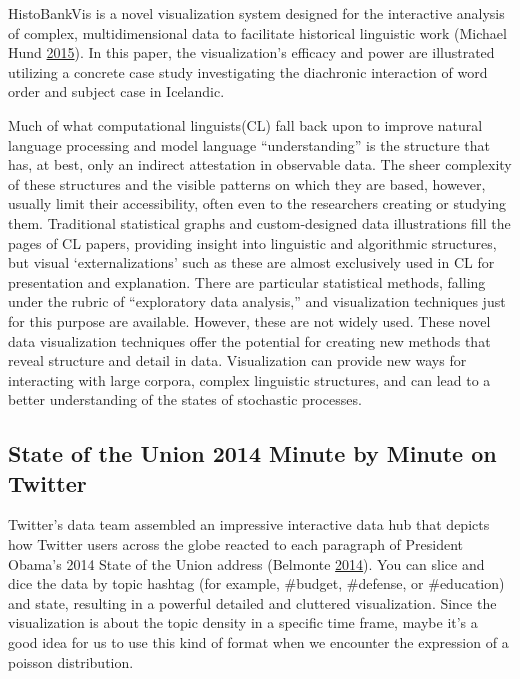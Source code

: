 \documentclass[]{book}
\begin{document}
HistoBankVis is a novel visualization system designed for the interactive analysis of complex, multidimensional data to facilitate historical linguistic work (Michael Hund \protect\hyperlink{ref-lingui_data1}{2015}). In this paper, the visualization's efficacy and power are illustrated utilizing a concrete case study investigating the diachronic interaction of word order and subject case in Icelandic.

Much of what computational linguists(CL) fall back upon to improve natural language processing and model language ``understanding'' is the structure that has, at best, only an indirect attestation in observable data. The sheer complexity of these structures and the visible patterns on which they are based, however, usually limit their accessibility, often even to the researchers creating or studying them. Traditional statistical graphs and custom-designed data illustrations fill the pages of CL papers, providing insight into linguistic and algorithmic structures, but visual `externalizations' such as these are almost exclusively used in CL for presentation and explanation. There are particular statistical methods, falling under the rubric of ``exploratory data analysis,'' and visualization techniques just for this purpose are available. However, these are not widely used. These novel data visualization techniques offer the potential for creating new methods that reveal structure and detail in data. Visualization can provide new ways for interacting with large corpora, complex linguistic structures, and can lead to a better understanding of the states of stochastic processes.

\hypertarget{state-of-the-union-2014-minute-by-minute-on-twitter}{%
\subsection{State of the Union 2014 Minute by Minute on Twitter}\label{state-of-the-union-2014-minute-by-minute-on-twitter}}

Twitter's data team assembled an impressive interactive data hub that depicts how Twitter users across the globe reacted to each paragraph of President Obama's 2014 State of the Union address (Belmonte \protect\hyperlink{ref-SotU2014}{2014}). You can slice and dice the data by topic hashtag (for example, \#budget, \#defense, or \#education) and state, resulting in a powerful detailed and cluttered visualization. Since the visualization is about the topic density in a specific time frame, maybe it's a good idea for us to use this kind of format when we encounter the expression of a poisson distribution.
\end{document}
